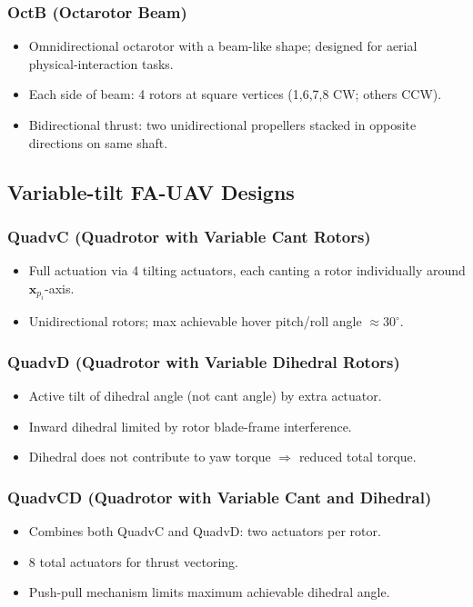\documentclass[11pt,a4paper]{article}
\newcommand{\vect}[1]{\bm{#1}}
\begin{document}
\subsubsection*{OctB (Octarotor Beam)}
\begin{itemize}
  \item Omnidirectional octarotor with a beam-like shape; designed for aerial physical-interaction tasks.
  \item Each side of beam: 4 rotors at square vertices (1,6,7,8 CW; others CCW).
  \item Bidirectional thrust: two unidirectional propellers stacked in opposite directions on same shaft.
\end{itemize}

\subsection{Variable-tilt FA-UAV Designs}

\subsubsection*{QuadvC (Quadrotor with Variable Cant Rotors)}
\begin{itemize}
  \item Full actuation via 4 tilting actuators, each canting a rotor individually around $\vect{x}_{p_i}$-axis.
  \item Unidirectional rotors; max achievable hover pitch/roll angle $\approx 30^\circ$.
\end{itemize}

\subsubsection*{QuadvD (Quadrotor with Variable Dihedral Rotors)}
\begin{itemize}
  \item Active tilt of dihedral angle (not cant angle) by extra actuator.
  \item Inward dihedral limited by rotor blade-frame interference.
  \item Dihedral does not contribute to yaw torque $\Rightarrow$ reduced total torque.
\end{itemize}

\subsubsection*{QuadvCD (Quadrotor with Variable Cant and Dihedral)}
\begin{itemize}
  \item Combines both QuadvC and QuadvD: two actuators per rotor.
  \item 8 total actuators for thrust vectoring.
  \item Push-pull mechanism limits maximum achievable dihedral angle.
\end{itemize}
\end{document}
